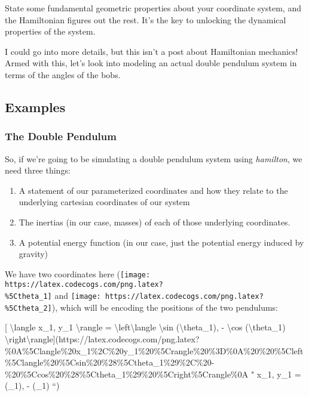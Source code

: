 \documentclass[]{article}
\begin{document}
State some fundamental geometric properties about your coordinate system, and
the Hamiltonian figures out the rest. It's the key to unlocking the dynamical
properties of the system.

I could go into more details, but this isn't a post about Hamiltonian mechanics!
Armed with this, let's look into modeling an actual double pendulum system in
terms of the angles of the bobs.

\subsection{Examples}\label{examples}

\subsubsection{The Double Pendulum}\label{the-double-pendulum}

So, if we're going to be simulating a double pendulum system using
\emph{hamilton}, we need three things:

\begin{enumerate}
\def\labelenumi{\arabic{enumi}.}
\item
  A statement of our parameterized coordinates and how they relate to the
  underlying cartesian coordinates of our system
\item
  The inertias (in our case, masses) of each of those underlying coordinates.
\item
  A potential energy function (in our case, just the potential energy induced by
  gravity)
\end{enumerate}

We have two coordinates here
(\texttt{[image: https://latex.codecogs.com/png.latex?\\\%5Ctheta\_1]} and
\texttt{[image: https://latex.codecogs.com/png.latex?\\\%5Ctheta\_2]}), which will
be encoding the positions of the two pendulums:

{[} \textbackslash{}langle x\_1, y\_1 \textbackslash{}rangle =
\textbackslash{}left\textbackslash{}langle \textbackslash{}sin
(\textbackslash{}theta\_1), - \textbackslash{}cos (\textbackslash{}theta\_1)
\textbackslash{}right\textbackslash{}rangle{]}(https://latex.codecogs.com/png.latex?\%0A\%5Clangle\%20x\_1\%2C\%20y\_1\%20\%5Crangle\%20\%3D\%0A\%20\%20\%5Cleft\%5Clangle\%20\%5Csin\%20\%28\%5Ctheta\_1\%29\%2C\%20-\%20\%5Ccos\%20\%28\%5Ctheta\_1\%29\%20\%5Cright\%5Crangle\%0A
" \langle x\_1, y\_1 \rangle = \left\langle \sin (\theta\_1), - \cos (\theta\_1)
\right\rangle
``)
\end{document}
